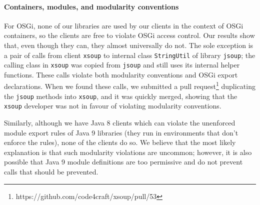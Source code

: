 %








\paragraph{Containers, modules, and modularity conventions}
For OSGi, none of our libraries are used by our clients in the context of OSGi containers, so the clients are free to violate OSGi access control. Our results show that, even though they can, they almost universally do not. The sole exception is a pair of calls from client \texttt{xsoup} to internal class \texttt{StringUtil} of library \texttt{jsoup}; the calling class in \texttt{xsoup} was copied from \texttt{jsoup} and still uses its internal helper functions. These calls violate both modularity conventions and OSGi export declarations. When we found these calls, we submitted a pull request\footnote{https://github.com/code4craft/xsoup/pull/53} duplicating the \texttt{jsoup} methods into \texttt{xsoup}, and it was quickly merged, showing that the \texttt{xsoup} developer was not in favour of violating modularity conventions.

Similarly, although we have Java 8 clients which can violate the unenforced module export rules of Java 9 libraries (they run in environments that don't enforce the rules), none of the clients do so. We believe that the most likely explanation is that such modularity violations are uncommon; however, it is also possible that Java 9 module definitions are too permissive and do not prevent calls that should be prevented.

